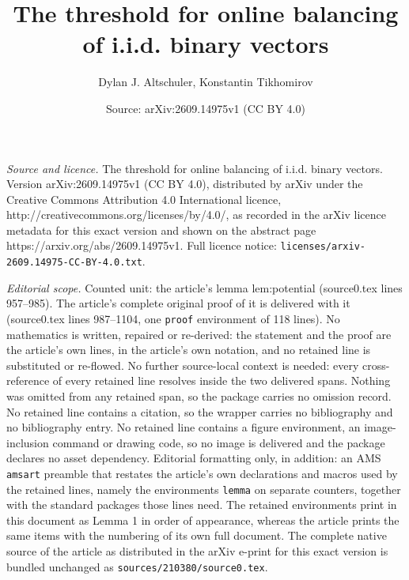 \documentclass[10pt,a4paper]{amsart}
\title{The threshold for online balancing of i.i.d. binary vectors}
\author{Dylan J. Altschuler, Konstantin Tikhomirov}
\date{Source: arXiv:2609.14975v1 (CC BY 4.0)}
\begin{document}
\maketitle

\noindent\emph{Source and licence.} The threshold for online balancing of i.i.d. binary vectors. Version arXiv:2609.14975v1 (CC BY 4.0), distributed by arXiv under the Creative Commons Attribution 4.0 International licence, http://creativecommons.org/licenses/by/4.0/, as recorded in the arXiv licence metadata for this exact version and shown on the abstract page https://arxiv.org/abs/2609.14975v1. Full licence notice: \texttt{licenses/arxiv-2609.14975-CC-BY-4.0.txt}.\par\smallskip

\noindent\textit{Editorial scope.} Counted unit: the article's lemma lem:potential (source0.tex lines 957--985). The article's complete original proof of it is delivered with it (source0.tex lines 987--1104, one \texttt{proof} environment of 118 lines). No mathematics is written, repaired or re-derived: the statement and the proof are the article's own lines, in the article's own notation, and no retained line is substituted or re-flowed.  No further source-local context is needed: every cross-reference of every retained line resolves inside the two delivered spans.  Nothing was omitted from any retained span, so the package carries no omission record.  No retained line contains a citation, so the wrapper carries no bibliography and no bibliography entry.  No retained line contains a figure environment, an image-inclusion command or drawing code, so no image is delivered and the package declares no asset dependency.  Editorial formatting only, in addition: an AMS \texttt{amsart} preamble that restates the article's own declarations and macros used by the retained lines, namely the environments \texttt{lemma} on separate counters, together with the standard packages those lines need.  The retained environments print in this document as Lemma 1 in order of appearance, whereas the article prints the same items with the numbering of its own full document.  The complete native source of the article as distributed in the arXiv e-print for this exact version is bundled unchanged as \texttt{sources/210380/source0.tex}.
\end{document}
